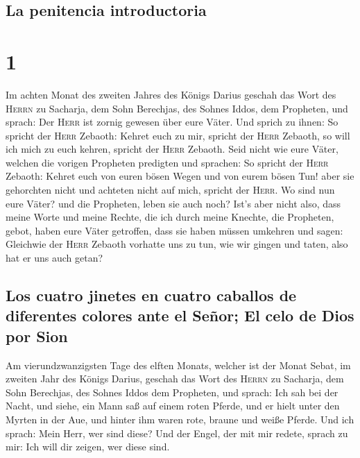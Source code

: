 \hypertarget{la-penitencia-introductoria}{%
\subsection{La penitencia
introductoria}\label{la-penitencia-introductoria}}

\hypertarget{section}{%
\section{1}\label{section}}

 Im achten Monat des zweiten Jahres des Königs Darius
geschah das Wort des \textsc{Herrn} zu Sacharja, dem Sohn Berechjas, des
Sohnes Iddos, dem Propheten, und sprach:  Der
\textsc{Herr} ist zornig gewesen über eure Väter.  Und
sprich zu ihnen: So spricht der \textsc{Herr} Zebaoth: Kehret euch zu
mir, spricht der \textsc{Herr} Zebaoth, so will ich mich zu euch kehren,
spricht der \textsc{Herr} Zebaoth.  Seid nicht wie eure
Väter, welchen die vorigen Propheten predigten und sprachen: So spricht
der \textsc{Herr} Zebaoth: Kehret euch von euren bösen Wegen und von
eurem bösen Tun! aber sie gehorchten nicht und achteten nicht auf mich,
spricht der \textsc{Herr}.  Wo sind nun eure Väter? und
die Propheten, leben sie auch noch?  Ist's aber nicht
also, dass meine Worte und meine Rechte, die ich durch meine Knechte,
die Propheten, gebot, haben eure Väter getroffen, dass sie haben müssen
umkehren und sagen: Gleichwie der \textsc{Herr} Zebaoth vorhatte uns zu
tun, wie wir gingen und taten, also hat er uns auch getan?

\hypertarget{los-cuatro-jinetes-en-cuatro-caballos-de-diferentes-colores-ante-el-seuxf1or-el-celo-de-dios-por-sion}{%
\subsection{Los cuatro jinetes en cuatro caballos de diferentes colores
ante el Señor; El celo de Dios por
Sion}\label{los-cuatro-jinetes-en-cuatro-caballos-de-diferentes-colores-ante-el-seuxf1or-el-celo-de-dios-por-sion}}

 Am vierundzwanzigsten Tage des elften Monats, welcher ist
der Monat Sebat, im zweiten Jahr des Königs Darius, geschah das Wort des
\textsc{Herrn} zu Sacharja, dem Sohn Berechjas, des Sohnes Iddos dem
Propheten, und sprach:  Ich sah bei der Nacht, und siehe,
ein Mann saß auf einem roten Pferde, und er hielt unter den Myrten in
der Aue, und hinter ihm waren rote, braune und weiße Pferde.
 Und ich sprach: Mein Herr, wer sind diese? Und der Engel,
der mit mir redete, sprach zu mir: Ich will dir zeigen, wer diese sind.

